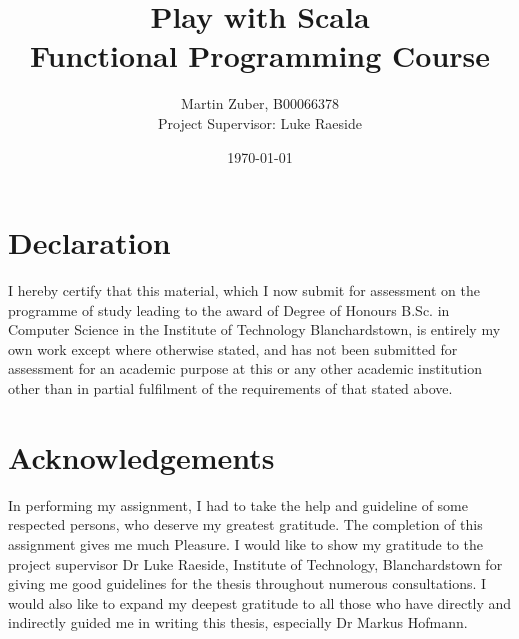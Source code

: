 \documentclass[12pt,twoside,a4paper]{report}
\title{Play with Scala\\Functional Programming Course}
\author{Martin Zuber, B00066378 \\ Project Supervisor:  Luke Raeside}
\date{\today}
\begin{document}
\maketitle
\newpage








\chapter*{Declaration}
I hereby certify that this material, which I now submit for assessment on the programme of study leading to the award of Degree of Honours B.Sc. in Computer Science in the Institute of Technology Blanchardstown, is entirely my own work except where otherwise stated, and has not been submitted for assessment for an academic purpose at this or any other academic institution other than in partial fulfilment of the requirements of that stated above.









\chapter*{Acknowledgements}
In performing my assignment, I had to take the help and guideline of some respected persons, who deserve my greatest gratitude. The completion of this assignment gives me much Pleasure. I would like to show my gratitude to the project supervisor Dr Luke Raeside, Institute of Technology, Blanchardstown for giving me good guidelines for the thesis throughout numerous consultations. I would also like to expand my deepest gratitude to all those who have directly and indirectly guided me in writing this thesis, especially Dr Markus Hofmann.








\end{document}
